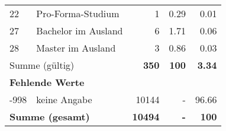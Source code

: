 \begin{longtable}{lXrrr}
     22 &
     \multicolumn{1}{X}{ Pro-Forma-Studium   } &


       \num{1} &
       \num[round-mode=places,round-precision=2]{0.29} &
         \num[round-mode=places,round-precision=2]{0.01} \\

     27 &
     \multicolumn{1}{X}{ Bachelor im Ausland   } &


       \num{6} &
       \num[round-mode=places,round-precision=2]{1.71} &
         \num[round-mode=places,round-precision=2]{0.06} \\

     28 &
     \multicolumn{1}{X}{ Master im Ausland   } &


       \num{3} &
       \num[round-mode=places,round-precision=2]{0.86} &
         \num[round-mode=places,round-precision=2]{0.03} \\
     \midrule
     \multicolumn{2}{l}{Summe (gültig)} &
       \textbf{\num{350}} &
     \textbf{\num{100}} &
       \textbf{\num[round-mode=places,round-precision=2]{3.34}} \\
     \multicolumn{5}{l}{\textbf{Fehlende Werte}}\\
       -998 &
       keine Angabe &
         \num{10144} &
        - &
         \num[round-mode=places,round-precision=2]{96.66} \\
     \midrule
     \multicolumn{2}{l}{\textbf{Summe (gesamt)}} &
          \textbf{\num{10494}} &
        \textbf{-} &
        \textbf{\num{100}} \\
     \bottomrule
     \end{longtable}
     
